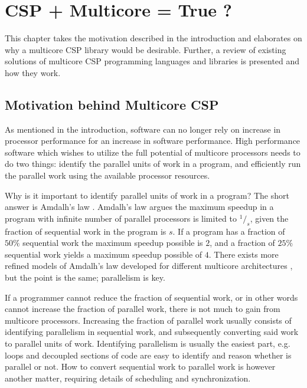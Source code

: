

\chapter{CSP + Multicore = True ?}
\label{ch:multicore_csp}


This chapter takes the motivation described in the introduction and elaborates on why a multicore CSP library would be desirable. Further, a review of existing solutions of multicore CSP programming languages and libraries is presented and how they work.


\section{Motivation behind Multicore CSP}
\label{sec:multicore_csp_motivation}


As mentioned in the introduction, software can no longer rely on increase in processor performance for an increase in software performance. High performance software which wishes to utilize the full potential of multicore processors needs to do two things: identify the parallel units of work in a program, and efficiently run the parallel work using the available processor resources. 

Why is it important to identify parallel units of work in a program? The short answer is Amdalh's law \citep{amdahl1967validity}. Amdalh's law argues the maximum speedup in a program with infinite number of parallel processors is limited to $^1/_s$, given the fraction of sequential work in the program is $s$. If a program has a fraction of $50\%$ sequential work the maximum speedup possible is $2$, and a fraction of $25\%$ sequential work yields a maximum speedup possible of $4$. There exists more refined models of Amdalh's law developed for different multicore architectures \citep{sun2010reevaluating}, but the point is the same; parallelism is key.

If a programmer cannot reduce the fraction of sequential work, or in other words cannot increase the fraction of parallel work, there is not much to gain from multicore processors. Increasing the fraction of parallel work usually consists of identifying parallelism in sequential work, and subsequently converting said work to parallel units of work. Identifying parallelism is usually the easiest part, e.g. loops and decoupled sections of code are easy to identify and reason whether is parallel or not. How to convert sequential work to parallel work is however another matter, requiring details of scheduling and synchronization.

